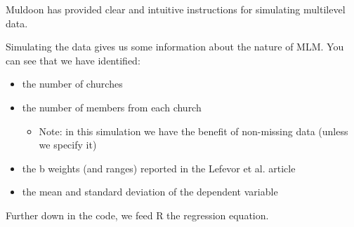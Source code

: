 \documentclass[
  english,
]{book}
\providecommand{\tightlist}{%
  \setlength{\itemsep}{0pt}\setlength{\parskip}{0pt}}
\begin{document}
Muldoon \citeyearpar{muldoon_simulate_2018} has provided clear and intuitive instructions for simulating multilevel data.

Simulating the data gives us some information about the nature of MLM. You can see that we have identified:

\begin{itemize}
\tightlist
\item
  the number of churches
\item
  the number of members from each church

  \begin{itemize}
  \tightlist
  \item
    Note: in this simulation we have the benefit of non-missing data (unless we specify it)
  \end{itemize}
\item
  the b weights (and ranges) reported in the Lefevor et al. \citeyearpar{lefevor_homonegativity_2020} article
\item
  the mean and standard deviation of the dependent variable
\end{itemize}

Further down in the code, we feed R the regression equation.
\end{document}
